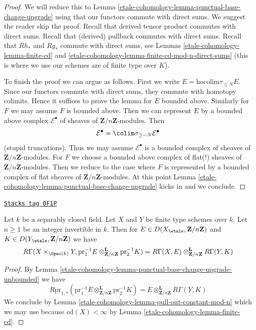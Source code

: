 \begin{proof}
We will reduce this to
Lemma \ref{etale-cohomology-lemma-punctual-base-change-upgrade}
using that our functors commute with direct sums.
We suggest the reader skip the proof.
Recall that derived tensor product commutes with
direct sums. Recall that (derived) pullback commutes with direct sums.
Recall that $Rh_*$ and $Rg_*$ commute with direct sums, see
Lemmas \ref{etale-cohomology-lemma-finite-cd} and
\ref{etale-cohomology-lemma-finite-cd-mod-n-direct-sums}
(this is where we use our schemes are of finite type
over $K$).

\medskip\noindent
To finish the proof we can argue as follows.
First we write $E = \text{hocolim} \tau_{\leq N} E$.
Since our functors commute with direct sums, they commute
with homotopy colimits. Hence it suffices to prove
the lemma for $E$ bounded above. Similarly for $F$ we
may assume $F$ is bounded above.
Then we can represent $E$ by a bounded above complex
$\mathcal{E}^\bullet$ of sheaves of $\mathbf{Z}/n\mathbf{Z}$-modules.
Then
$$
\mathcal{E}^\bullet = \colim \sigma_{\geq -N}\mathcal{E}^\bullet
$$
(stupid truncations).
Thus we may assume $\mathcal{E}^\bullet$ is a bounded
complex of sheaves of $\mathbf{Z}/n\mathbf{Z}$-modules.
For $F$ we choose a bounded above complex of
flat(!) sheaves of $\mathbf{Z}/n\mathbf{Z}$-modules.
Then we reduce to the case where $F$ is represented
by a bounded complex of flat sheaves of $\mathbf{Z}/n\mathbf{Z}$-modules.
At this point Lemma \ref{etale-cohomology-lemma-punctual-base-change-upgrade}
kicks in and we conclude.
\end{proof}

\begin{lemma}[Kunneth]
\label{etale-cohomology-lemma-kunneth}
\href{https://stacks.math.columbia.edu/tag/0F1P}{\texttt{Stacks tag 0F1P}}

Let $k$ be a separably closed field. Let $X$ and $Y$ be
finite type schemes over $k$. Let $n \geq 1$ be an integer
invertible in $k$. Then for
$E \in D(X_\etale, \mathbf{Z}/n\mathbf{Z})$ and
$K \in D(Y_\etale, \mathbf{Z}/n\mathbf{Z})$
we have
$$
R\Gamma(X \times_{\Spec(k)} Y,
\text{pr}_1^{-1}E
\otimes_{\mathbf{Z}/n\mathbf{Z}}^\mathbf{L}
\text{pr}_2^{-1}K
)
=
R\Gamma(X, E)
\otimes_{\mathbf{Z}/n\mathbf{Z}}^\mathbf{L}
R\Gamma(Y, K)
$$
\end{lemma}

\begin{proof}
By Lemma \ref{etale-cohomology-lemma-punctual-base-change-upgrade-unbounded} we have
$$
R\text{pr}_{1, *}(
\text{pr}_1^{-1}E
\otimes_{\mathbf{Z}/n\mathbf{Z}}^\mathbf{L}
\text{pr}_2^{-1}K) =
E \otimes_{\mathbf{Z}/n\mathbf{Z}}^\mathbf{L}
\underline{R\Gamma(Y, K)}
$$
We conclude by
Lemma \ref{etale-cohomology-lemma-pull-out-constant-mod-n}
which we may use because
$\text{cd}(X) < \infty$ by Lemma \ref{etale-cohomology-lemma-finite-cd}.
\end{proof}

